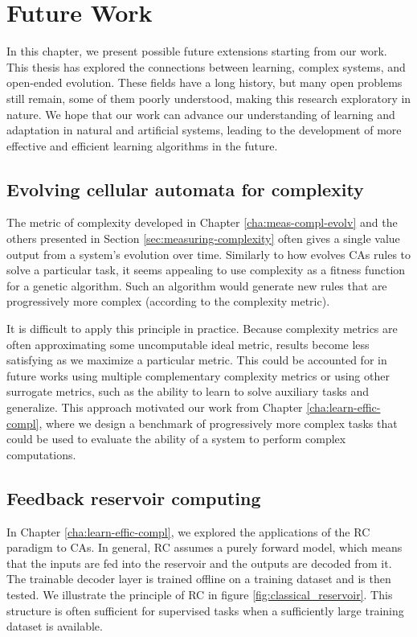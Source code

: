 \chapter{Future Work}

In this chapter, we present possible future extensions starting from our work.
This thesis has explored the connections between learning, complex systems, and
open-ended evolution. These fields have a long history, but many open problems
still remain, some of them poorly understood, making this research exploratory
in nature. We hope that our work can advance our understanding of learning and
adaptation in natural and artificial systems, leading to the development of more
effective and efficient learning algorithms in the future.

\section{Evolving cellular automata for complexity}

The metric of complexity developed in Chapter \ref{cha:meas-compl-evolv} and the
others presented in Section \ref{sec:measuring-complexity} often gives a single
value output from a system's evolution over time. Similarly to how
\textcite{mitchellEvolvingCellularAutomata1996} evolves \acp{CA} rules to solve
a particular task, it seems appealing to use complexity as a fitness
function for a genetic algorithm. Such an algorithm would generate new rules
that are progressively more complex (according to the complexity metric).

It is difficult to apply this principle in practice. Because complexity metrics are
often approximating some uncomputable ideal metric, results become less satisfying
as we maximize a particular metric. This could be accounted for in future
works using multiple complementary complexity metrics or using other surrogate
metrics, such as the ability to learn to solve auxiliary tasks and generalize.
This approach motivated our work from Chapter \ref{cha:learn-effic-compl}, where
we design a benchmark of progressively more complex tasks that could be used to
evaluate the ability of a system to perform complex computations.

\section{Feedback reservoir computing}

In Chapter \ref{cha:learn-effic-compl}, we explored the applications of the
\ac{RC} paradigm to \acp{CA}. In general, \ac{RC} assumes a purely forward
model, which means that the inputs are fed into the reservoir and the outputs are decoded from
it. The trainable decoder layer is trained offline on a training dataset and
is then tested. We illustrate the  principle of \ac{RC} in figure
\ref{fig:classical_reservoir}. This structure is often sufficient for supervised
tasks when a sufficiently large training dataset is available.

